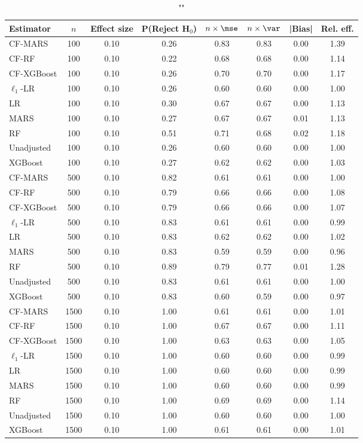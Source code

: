 \begin{table}
\centering
\caption{""}
\begin{tabular}{lccccccc}
\toprule
Estimator & $n$ & Effect size & P(Reject H$_0$) & $n\times\mse$ & $n\times \var$ & |Bias| & Rel. eff.\\ \midrule
CF-MARS & 100 & 0.10 & 0.26 & 0.83 & 0.83 & 0.00 & 1.39 \\ 
CF-RF & 100 & 0.10 & 0.22 & 0.68 & 0.68 & 0.00 & 1.14 \\ 
CF-XGBoost & 100 & 0.10 & 0.26 & 0.70 & 0.70 & 0.00 & 1.17 \\ 
$\ell_1$-LR & 100 & 0.10 & 0.26 & 0.60 & 0.60 & 0.00 & 1.00 \\ 
LR & 100 & 0.10 & 0.30 & 0.67 & 0.67 & 0.00 & 1.13 \\ 
MARS & 100 & 0.10 & 0.27 & 0.67 & 0.67 & 0.01 & 1.13 \\ 
RF & 100 & 0.10 & 0.51 & 0.71 & 0.68 & 0.02 & 1.18 \\ 
Unadjusted & 100 & 0.10 & 0.26 & 0.60 & 0.60 & 0.00 & 1.00 \\ 
XGBoost & 100 & 0.10 & 0.27 & 0.62 & 0.62 & 0.00 & 1.03 \\ \addlinespace 
CF-MARS & 500 & 0.10 & 0.82 & 0.61 & 0.61 & 0.00 & 1.00 \\ 
CF-RF & 500 & 0.10 & 0.79 & 0.66 & 0.66 & 0.00 & 1.08 \\ 
CF-XGBoost & 500 & 0.10 & 0.79 & 0.66 & 0.66 & 0.00 & 1.07 \\ 
$\ell_1$-LR & 500 & 0.10 & 0.83 & 0.61 & 0.61 & 0.00 & 0.99 \\ 
LR & 500 & 0.10 & 0.83 & 0.62 & 0.62 & 0.00 & 1.02 \\ 
MARS & 500 & 0.10 & 0.83 & 0.59 & 0.59 & 0.00 & 0.96 \\ 
RF & 500 & 0.10 & 0.89 & 0.79 & 0.77 & 0.01 & 1.28 \\ 
Unadjusted & 500 & 0.10 & 0.83 & 0.61 & 0.61 & 0.00 & 1.00 \\ 
XGBoost & 500 & 0.10 & 0.83 & 0.60 & 0.59 & 0.00 & 0.97 \\ \addlinespace 
CF-MARS & 1500 & 0.10 & 1.00 & 0.61 & 0.61 & 0.00 & 1.01 \\ 
CF-RF & 1500 & 0.10 & 1.00 & 0.67 & 0.67 & 0.00 & 1.11 \\ 
CF-XGBoost & 1500 & 0.10 & 1.00 & 0.63 & 0.63 & 0.00 & 1.05 \\ 
$\ell_1$-LR & 1500 & 0.10 & 1.00 & 0.60 & 0.60 & 0.00 & 0.99 \\ 
LR & 1500 & 0.10 & 1.00 & 0.60 & 0.60 & 0.00 & 0.99 \\ 
MARS & 1500 & 0.10 & 1.00 & 0.60 & 0.60 & 0.00 & 0.99 \\ 
RF & 1500 & 0.10 & 1.00 & 0.69 & 0.69 & 0.00 & 1.14 \\ 
Unadjusted & 1500 & 0.10 & 1.00 & 0.60 & 0.60 & 0.00 & 1.00 \\ 
XGBoost & 1500 & 0.10 & 1.00 & 0.61 & 0.61 & 0.00 & 1.01 \\
\bottomrule
\end{tabular}
\end{table}


